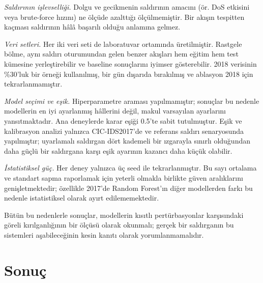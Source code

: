 \documentclass[conference]{IEEEtran}
\begin{document}
\emph{Saldırının işlevselliği.} Dolgu ve gecikmenin saldırının amacını (ör. DoS etkisini veya brute-force hızını) ne ölçüde azalttığı ölçülmemiştir. Bir akışın tespitten kaçması saldırının hâlâ başarılı olduğu anlamına gelmez.

\emph{Veri setleri.} Her iki veri seti de laboratuvar ortamında üretilmiştir. Rastgele bölme, aynı saldırı oturumundan gelen benzer akışları hem eğitim hem test kümesine yerleştirebilir ve baseline sonuçlarını iyimser gösterebilir. 2018 verisinin \%30'luk bir örneği kullanılmış, bir gün dışarıda bırakılmış ve ablasyon 2018 için tekrarlanmamıştır.

\emph{Model seçimi ve eşik.} Hiperparametre araması yapılmamıştır; sonuçlar bu nedenle modellerin en iyi ayarlanmış hâllerini değil, makul varsayılan ayarlarını yansıtmaktadır. Ana deneylerde karar eşiği 0.5'te sabit tutulmuştur. Eşik ve kalibrasyon analizi yalnızca CIC-IDS2017'de ve referans saldırı senaryosunda yapılmıştır; uyarlamalı saldırgan dört kademeli bir ızgarayla sınırlı olduğundan daha güçlü bir saldırgana karşı eşik ayarının kazancı daha küçük olabilir.

\emph{İstatistiksel güç.} Her deney yalnızca üç seed ile tekrarlanmıştır. Bu sayı ortalama ve standart sapma raporlamak için yeterli olmakla birlikte güven aralıklarını genişletmektedir; özellikle 2017'de Random Forest'ın diğer modellerden farkı bu nedenle istatistiksel olarak ayırt edilememektedir.

Bütün bu nedenlerle sonuçlar, modellerin kısıtlı pertürbasyonlar karşısındaki göreli kırılganlığının bir ölçüsü olarak okunmalı; gerçek bir saldırganın bu sistemleri aşabileceğinin kesin kanıtı olarak yorumlanmamalıdır.

\section{Sonuç}
\end{document}
